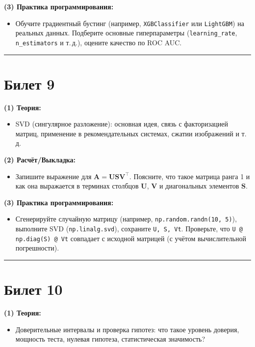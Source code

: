 \documentclass[a4paper,12pt]{article}
\begin{document}
\textbf{(3) Практика программирования:}
\begin{itemize}
  \item Обучите градиентный бустинг (например, \texttt{XGBClassifier} или \texttt{LightGBM}) на реальных данных. Подберите основные гиперпараметры (\texttt{learning\_rate}, \texttt{n\_estimators} и т.\,д.), оцените качество по ROC AUC.
\end{itemize}

\noindent\rule{\textwidth}{0.4pt}
\newpage

\section*{Билет 9}
\textbf{(1) Теория:}
\begin{itemize}
  \item SVD (сингулярное разложение): основная идея, связь с факторизацией матриц, применение в рекомендательных системах, сжатии изображений и т.\,д.
\end{itemize}

\textbf{(2) Расчёт/Выкладка:}
\begin{itemize}
  \item Запишите выражение для $\mathbf{A} = \mathbf{U}\mathbf{S}\mathbf{V}^\top$. Поясните, что такое матрица ранга 1 и как она выражается в терминах столбцов $\mathbf{U}$, $\mathbf{V}$ и диагональных элементов $\mathbf{S}$.
\end{itemize}

\textbf{(3) Практика программирования:}
\begin{itemize}
  \item Сгенерируйте случайную матрицу (например, \texttt{np.random.randn(10, 5)}), выполните SVD (\texttt{np.linalg.svd}), сохраните \texttt{U, S, Vt}. Проверьте, что \texttt{U @ np.diag(S) @ Vt} совпадает с исходной матрицей (с учётом вычислительной погрешности).
\end{itemize}

\noindent\rule{\textwidth}{0.4pt}

\section*{Билет 10}
\textbf{(1) Теория:}
\begin{itemize}
  \item Доверительные интервалы и проверка гипотез: что такое уровень доверия, мощность теста, нулевая гипотеза, статистическая значимость?
\end{itemize}
\end{document}
